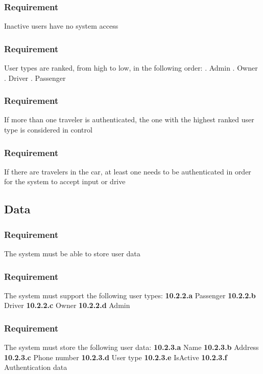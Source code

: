 \documentclass{article}
\begin{document}
{      \subsubsection{Requirement}
\hfill \break 
\- \- \-Inactive users have no system access
      \subsubsection{Requirement}
\hfill \break 
\- \- \-User types are ranked, from high to low, in the following order:
\hfill \break 
{}. Admin
\hfill \break 
{}. Owner
\hfill \break 
{}. Driver
\hfill \break 
{}. Passenger
      \subsubsection{Requirement}
\hfill \break 
\- \- \-If more than one traveler is authenticated, the one with the highest ranked user type is considered in control
      \subsubsection{Requirement}
\hfill \break 
\- \- \-If there are travelers in the car, at least one needs to be authenticated in order for the system to accept input or drive
  \subsection{Data}
      \subsubsection{Requirement}
\hfill \break 
\- \- \-The system must be able to store user data
      \subsubsection{Requirement}
\hfill \break 
\- \- \-The system must support the following user types:
\hfill \break 
\indent
\textbf{10.2.2.a} Passenger
\hfill \break 
\indent
\textbf{10.2.2.b} Driver
\hfill \break 
\indent
\textbf{10.2.2.c} Owner
\hfill \break 
\indent
\textbf{10.2.2.d} Admin
      \subsubsection{Requirement}
\hfill \break 
\- \- \-The system must store the following user data:
\hfill \break 
\indent
\textbf{10.2.3.a} Name
\hfill \break 
\indent
\textbf{10.2.3.b} Address
\hfill \break 
\indent
\textbf{10.2.3.c} Phone number
\hfill \break 
\indent
\textbf{10.2.3.d} User type
\hfill \break 
\indent
\textbf{10.2.3.e} IsActive
\hfill \break 
\indent
\textbf{10.2.3.f} Authentication data
}
\end{document}
